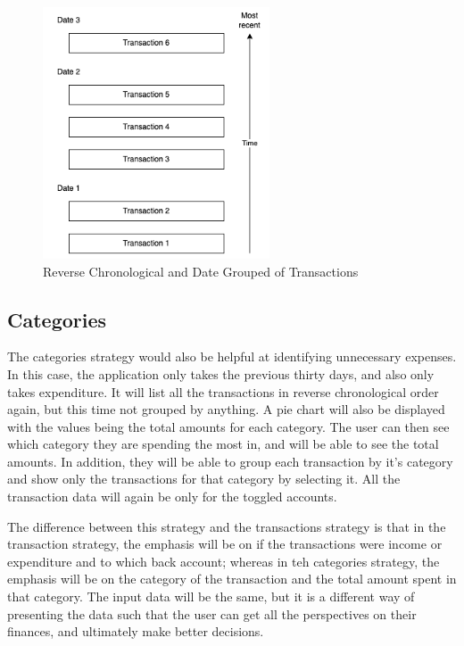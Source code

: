 \begin{figure}[h!]
	\centering
	\includegraphics[width=0.6\textwidth]{images/Transaction_labels.png}
	\caption{Reverse Chronological and Date Grouped of Transactions}
	\label{fig:TransactionLabels}
\end{figure}

\subsection{Categories}
The categories strategy would also be helpful at identifying unnecessary expenses. In this case, the application only takes the previous thirty days, and also only takes expenditure. It will list all the transactions in reverse chronological order again, but this time not grouped by anything. A pie chart will also be displayed with the values being the total amounts for each category. The user can then see which category they are spending the most in, and will be able to see the total amounts. In addition, they will be able to group each transaction by it's category and show only the transactions for that category by selecting it. All the transaction data will again be only for the toggled accounts.

The difference between this strategy and the transactions strategy is that in the transaction strategy, the emphasis will be on if the transactions were income or expenditure and to which back account; whereas in teh categories strategy, the emphasis will be on the category of the transaction and the total amount spent in that category. The input data will be the same, but it is a different way of presenting the data such that the user can get all the perspectives on their finances, and ultimately make better decisions.

